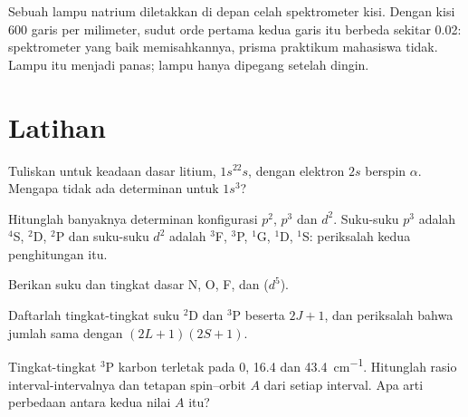 \begin{inthelab}
Sebuah lampu natrium diletakkan di depan celah spektrometer kisi. Dengan
kisi 600 garis per milimeter, sudut orde pertama kedua garis itu berbeda
sekitar \num{0.02}\textdegree: spektrometer yang baik memisahkannya, prisma
praktikum mahasiswa tidak. Lampu itu menjadi panas; lampu hanya dipegang
setelah dingin.
\end{inthelab}

\section{Latihan}

\begin{exercise}[$\star$]\label{exo:b3:many-electron-atoms:1}
Tuliskan  untuk keadaan dasar litium, $1s^22s$, dengan
elektron $2s$ berspin $\alpha$. Mengapa tidak ada determinan untuk
$1s^3$?
\end{exercise}

\begin{exercise}[$\star$]\label{exo:b3:many-electron-atoms:2}
Hitunglah banyaknya determinan konfigurasi $p^2$, $p^3$ dan $d^2$. Suku-suku
$p^3$ adalah ${}^4$S, ${}^2$D, ${}^2$P dan suku-suku $d^2$ adalah ${}^3$F, ${}^3$P, ${}^1$G,
${}^1$D, ${}^1$S: periksalah kedua penghitungan itu.
\end{exercise}

\begin{exercise}[$\star$]\label{exo:b3:many-electron-atoms:3}
Berikan suku dan tingkat dasar N, O, F,  dan  ($d^5$).
\end{exercise}

\begin{exercise}[$\star$]\label{exo:b3:many-electron-atoms:4}
Daftarlah tingkat-tingkat suku ${}^2$D dan ${}^3$P beserta  $2J+1$,
dan periksalah bahwa jumlah  sama dengan $(2L+1)(2S+1)$.
\end{exercise}

\begin{exercise}[$\star\star$]\label{exo:b3:many-electron-atoms:5}
Tingkat-tingkat ${}^3$P karbon terletak pada 0, 16.4 dan \qty{43.4}{cm^{-1}}.
Hitunglah rasio interval-intervalnya dan tetapan spin--orbit $A$ dari setiap
interval. Apa arti perbedaan antara kedua nilai $A$ itu?
\end{exercise}

